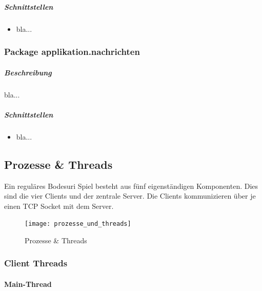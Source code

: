 \documentclass[12pt,halfparskip]{scrartcl}
\begin{document}
\subparagraph{Schnittstellen}
\label{ssub:schnittstellen}
\begin{itemize}
	\item bla...
\end{itemize}

\clearpage
\subsubsection{Package applikation.nachrichten}
\label{ssub:package_applikation_nachrichten} %
\subparagraph{Beschreibung}
\label{ssub:beschreibung}
bla...

\subparagraph{Schnittstellen}
\label{ssub:schnittstellen}
\begin{itemize}
	\item bla...
\end{itemize}


\clearpage

\subsection{Prozesse \& Threads} %
\label{sub:prozesse_threads}

Ein reguläres Bodesuri Spiel besteht aus fünf eigenständigen Komponenten. Dies sind die vier Clients und der zentrale Server. Die Clients kommunizieren über je einen TCP Socket mit dem Server.

\begin{figure}[h]
	\centering
	\texttt{[image: prozesse\_und\_threads]}
	\caption{Prozesse \& Threads}
	\label{fig:prozesse_und_threads}
\end{figure}

\subsubsection{Client Threads} %
\label{ssub:client_threads}


\paragraph{Main-Thread} %
\label{ssub:main_thread}
\end{document}
